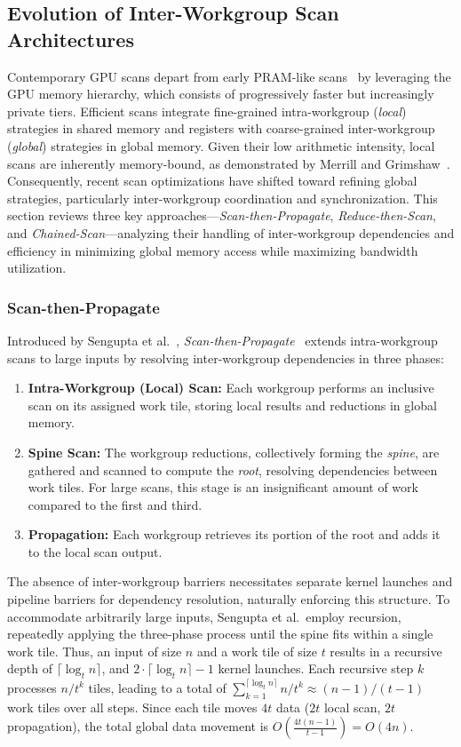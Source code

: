 \documentclass[sigconf]{acmart}
\begin{document}
\subsection{Evolution of Inter-Workgroup Scan Architectures}
Contemporary GPU scans depart from early PRAM-like scans~\cite{Horn, Hensley, Sengupta2006, Gress} by leveraging the GPU memory hierarchy, which consists of progressively faster but increasingly private tiers. Efficient scans integrate fine-grained intra-workgroup (\emph{local}) strategies in shared memory and registers with coarse-grained inter-workgroup (\emph{global}) strategies in global memory. Given their low arithmetic intensity, local scans are inherently memory-bound, as demonstrated by Merrill and Grimshaw~\cite{Merrill2009}. Consequently, recent scan optimizations have shifted toward refining global strategies, particularly inter-workgroup coordination and synchronization. This section reviews three key approaches---\emph{Scan-then-Propagate}, \emph{Reduce-then-Scan}, and \emph{Chained-Scan}---analyzing their handling of inter-workgroup dependencies and efficiency in minimizing global memory access while maximizing bandwidth utilization.

\subsubsection{Scan-then-Propagate}
Introduced by Sengupta et al.~\cite{10.5555/1280094.1280110}, \emph{Scan-then-Propagate}~\cite{GPUGems3, Sengupta2011} extends intra-workgroup scans to large inputs by resolving inter-workgroup dependencies in three phases:
\begin{enumerate}
  \item \textbf{Intra-Workgroup (Local) Scan:}  Each workgroup performs an inclusive scan on its assigned work tile, storing local results and reductions in global memory.
  \item \textbf{Spine Scan:} The workgroup reductions, collectively forming the \emph{spine}, are gathered and scanned to compute the \emph{root}, resolving dependencies between work tiles. For large scans, this stage is an insignificant amount of work compared to the first and third.
  \item \textbf{Propagation:} Each workgroup retrieves its portion of the root and adds it to the local scan output.
\end{enumerate}
The absence of inter-workgroup barriers necessitates separate kernel launches and pipeline barriers for dependency resolution, naturally enforcing this structure. To accommodate arbitrarily large inputs, Sengupta et al.\ employ recursion, repeatedly applying the three-phase process until the spine fits within a single work tile. Thus, an input of size $n$ and a work tile of size $t$ results in a recursive depth of $\lceil \log_t n \rceil$, and $2\cdot\lceil \log_t n \rceil - 1$ kernel launches. Each recursive step $k$ processes $n/t^k$ tiles, leading to a total of $\sum_{k=1}^{\lceil \log_t n \rceil} n/t^k \approx (n - 1)/(t - 1)$ work tiles over all steps. Since each tile moves $4t$ data ($2t$ local scan, $2t$ propagation), the total global data movement is $O\left(\frac{4t(n - 1)}{t - 1}\right) = O(4n)$.
\end{document}
